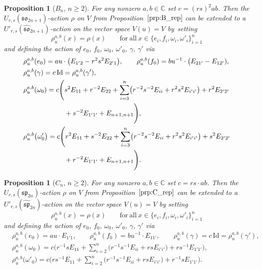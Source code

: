 \documentclass[10pt,a4paper]{amsart}
\numberwithin{equation}{section}
\newtheorem{Proposition}[Theorem]{Proposition}
 { \theoremstyle{definition}
\newtheorem{Definition}[Theorem]{Definition}
\newtheorem{Note}[Theorem]{Note}
\newtheorem{Example}[Theorem]{Example}
\newtheorem{Remark}[Theorem]{Remark} }
\newcommand{\BC}{\mathbb{C}}
\newcommand{\sso}{\mathfrak{so}}
\newcommand{\ssp}{\mathfrak{sp}}
\newcommand{\Id}{\mathrm{Id}}
\begin{document}
\begin{Proposition}[$B_n$, $n\geq 2$]\label{prop:B_aff_rep}
For any nonzero $a,b\in \BC$ set $c=(rs)^2 ab$. Then the $U_{r,s}(\sso_{2n+1})$-action $\rho$ on $V$ from Proposition~$\ref{prp:B_rep}$ can be extended to a $U'_{r,s}(\widehat{\sso}_{2n+1})$-action  on the vector space $V(u)=V$ by~setting
\begin{displaymath}
 \rho^{a,b}_u(x)=\rho(x) \qquad \mathrm{for\ all} \ x\in \bigl\{e_i,f_i,\omega_i,\omega'_i\bigr\}_{i=1}^{n}
\end{displaymath}
and defining the action of $e_0$, $f_0$, $\omega_0$, $\omega'_0$, $\gamma$, $\gamma'$ via
\begin{align*}
 & \rho^{a,b}_u(e_0)=au \cdot \bigl(E_{1' 2} - r^2s^2 E_{2' 1} \bigr), \qquad
 \rho^{a,b}_u(f_0)=bu^{-1} \cdot \bigl(E_{2 1'}-E_{1 2'}), \\
 &\rho^{a,b}_u(\gamma)=c \,\Id=\rho^{a,b}_u(\gamma') , \\
 & \rho^{a,b}_u(\omega_0)=
 c\Biggl( s^2E_{11}+r^{-2}E_{22}+\sum_{i=3}^{n} \bigl( r^{-2}s^{-2}E_{ii} + r^2s^2 E_{i'i'}\bigr) +
 r^2E_{2' 2'} \\
 & \hphantom{\rho^{a,b}_u(\omega_0)=c\Biggl(}{}
 + s^{-2}E_{1' 1'} + E_{n+1,n+1} \Biggr), \\
 & \rho^{a,b}_u\big(\omega'_0\big)=
 c\Biggl( r^2E_{11}+s^{-2}E_{22}+\sum_{i=3}^{n} \bigl( r^{-2}s^{-2}E_{ii} + r^2s^2 E_{i'i'}\bigr) +s^2E_{2' 2'}\\
 & \hphantom{\rho^{a,b}_u(\omega'_0)=c\Biggl(}{}
 + r^{-2}E_{1' 1'}+E_{n+1,n+1} \Biggr).
\end{align*}
\end{Proposition}

\begin{Proposition}[$C_n$, $n\geq 2$]\label{prop:C_aff_rep}
For any nonzero $a,b\in \BC$ set $c=rs\cdot ab$. Then the $U_{r,s}(\ssp_{2n})$-action $\rho$ on $V$ from Proposition~$\ref{prp:C_rep}$ can be extended to a $U'_{r,s}(\widehat{\ssp}_{2n})$-action  on the vector space $V(u)=V$ by setting
\begin{displaymath}
 \rho^{a,b}_u(x)=\rho(x) \qquad \mathrm{for\ all} \ x\in \bigl\{e_i,f_i,\omega_i,\omega'_i\bigr\}_{i=1}^{n}
\end{displaymath}
and defining the action of $e_0$, $f_0$, $\omega_0$, $\omega'_0$, $\gamma$, $\gamma'$ via
\begin{displaymath}
\begin{split}
 & \rho^{a,b}_u(e_0)=au \cdot E_{1' 1}, \qquad \rho^{a,b}_u(f_0)=bu^{-1} \cdot E_{1 1'}, \qquad
 \rho^{a,b}_u(\gamma)=c\, \Id=\rho^{a,b}_u(\gamma'),\\
 & \rho^{a,b}_u(\omega_0)=
 c\Biggl( r^{-1}sE_{11}+\sum_{i=2}^{n} \bigl( r^{-1}s^{-1}E_{ii} + rs E_{i'i'}\bigr) + rs^{-1}E_{1' 1'} \Biggr), \\
 & \rho^{a,b}_u\big(\omega'_0\big)=
 c\Biggl( rs^{-1}E_{11}+\sum_{i=2}^{n} \bigl( r^{-1}s^{-1}E_{ii} + rs E_{i'i'}\bigr) + r^{-1}sE_{1' 1'} \Biggr).
\end{split}
\end{displaymath}
\end{Proposition}
\end{document}
